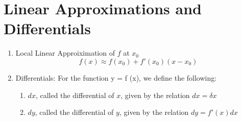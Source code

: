\section{Linear Approximations and Differentials}

\begin{myframe}[arc=10pt,auto outer arc]
\begin{enumerate}
\item Local Linear Approiximation of $f$ at $x_0$
\[ f(x) \approx f(x_0) + f'(x_0) (x - x_0) \]
\item Differentials: For the function y = f (x), we define the following:
\begin{enumerate}
\item $dx$, called the differential of $x$, given by the relation $dx = \delta x$
\item $dy$, called the differential of $y$, given by the relation $dy = f'(x)dx$
\end{enumerate}
\end{enumerate}
\end{myframe}


\newpage
{}



